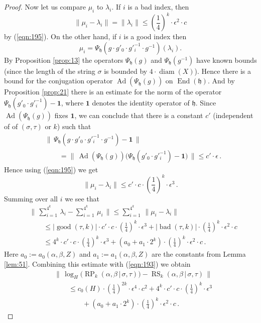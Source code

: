 \documentclass[10pt, a4paper]{amsart}
\theoremstyle{definition}
\numberwithin{equation}{section}
\newcommand{\opn}{\operatorname}
\newcommand{\mfrak}[1]{\mathfrak{#1}}
\newcommand{\smfrac}[2]{{\textstyle \frac{#1}{#2}}}
\newcommand{\bsym}[1]{\boldsymbol{#1}}
\newcommand{\bosum}{\sum\nolimits}
\newcommand{\norm}[1]{\lVert #1 \rVert}
\newcommand{\Norm}[1]{\bigl\lVert\, #1 \, \bigr\rVert}
\newcommand{\abs}[1]{\lvert #1 \rvert}
\renewcommand{\vert}{\, | \,}
\newcommand{\h}{\mfrak{h}}
\newcommand{\lb}{\linebreak}
\begin{document}
\begin{proof}
Now let us compare $\mu_i$ to $\lambda_i$. 
If $i$ is a bad index, then
\[ \norm{ \mu_i - \lambda_i } = \norm{\lambda_i} \leq 
(\smfrac{1}{4})^k \cdot \epsilon^2 \cdot c  \]
by (\ref{eqn:195}). On the other hand, if $i$ is a good index then 
\[ \mu_i = \Psi_{\h}(g \cdot g'_0 \cdot g'^{-1}_i \cdot g^{-1}) (\lambda_i) . \]
By Proposition \ref{prop:13} the operators $\Psi_{\h}(g)$ and
$\Psi_{\h}(g^{-1})$ have known \lb bounds (since the length of the string 
$\sigma$ is bounded by $4 \cdot \opn{diam}(X)$).
Hence there is a bound for the conjugation operator
$\opn{Ad}(\Psi_{\h}(g))$ on $\opn{End}(\h)$. 
And by Proposition \ref{prop:21} there is an estimate for the norm of the
operator 
$\Psi_{\h}(g'_0 \cdot g'^{-1}_i) - \bsym{1}$,
where $\bsym{1}$ denotes the identity operator of $\h$.
Since $\opn{Ad}(\Psi_{\h}(g))$ fixes $\bsym{1}$, we can conclude that 
there is a constant $c'$
(independent of of $(\sigma, \tau)$ or $k$) such that
\[ \begin{aligned}
& \Norm{ \Psi_{\h}(g \cdot g'_0 \cdot g'^{-1}_i \cdot g^{-1}) - \bsym{1} } \\
& \qquad = \Norm{ \opn{Ad}(\Psi_{\h}(g)) \bigl( 
\Psi_{\h}(g'_0 \cdot g'^{-1}_i) - \bsym{1} \bigr) } 
\leq c' \cdot \epsilon \, . 
\end{aligned} \]
Hence using (\ref{eqn:195}) we get
\[ \norm{ \mu_i - \lambda_i } \leq c' \cdot c \cdot
(\smfrac{1}{4})^k \cdot \epsilon^3 \, . \]
Summing over all $i$ we see that
\[ \begin{aligned}
& \Norm{ \bosum_{i = 1}^{4^k} \, \lambda_i - 
\bosum_{i = 1}^{4^k} \, \mu_i } 
\leq \sum_{i = 1}^{4^k} \, \norm{ \mu_i - \lambda_i } \\
& \qquad \leq \abs{\opn{good}(\tau, k)} \cdot 
c' \cdot c \cdot (\smfrac{1}{4})^k \cdot \epsilon^3 +
\abs{\opn{bad}(\tau, k)} \cdot (\smfrac{1}{4})^k \cdot \epsilon^2 \cdot c \\
& \qquad \leq 4^k \cdot c' \cdot c \cdot (\smfrac{1}{4})^k \cdot \epsilon^3 +
(a_0 + a_1 \cdot 2^k)  \cdot
(\smfrac{1}{4})^k \cdot \epsilon^2 \cdot c \, .  
\end{aligned} \]
Here $a_0 := a_0(\alpha, \beta, Z)$ and $a_1 := a_1(\alpha, \beta, Z)$ are the
constants from Lemma \ref{lem:51}. 
Combining this estimate with (\ref{eqn:193}) we obtain
\begin{equation} \label{eqn:196}
\begin{aligned}
& \Norm{ \log_H \bigl( \opn{RP}_k(\alpha, \beta \vert \sigma, \tau) \bigr) - 
\opn{RS}_k(\alpha, \beta \vert \sigma, \tau) } \\
& \qquad \leq 
c_0(H) \cdot (\smfrac{1}{4})^{2 k} \cdot \epsilon^4 \cdot c^2 +
4^k \cdot c' \cdot c \cdot (\smfrac{1}{4})^k \cdot \epsilon^3 \\
& \qquad \qquad +
(a_0 + a_1 \cdot 2^k)  \cdot (\smfrac{1}{4})^k \cdot \epsilon^2 \cdot c \, . 
\end{aligned}
\end{equation}


\end{proof}
\end{document}
